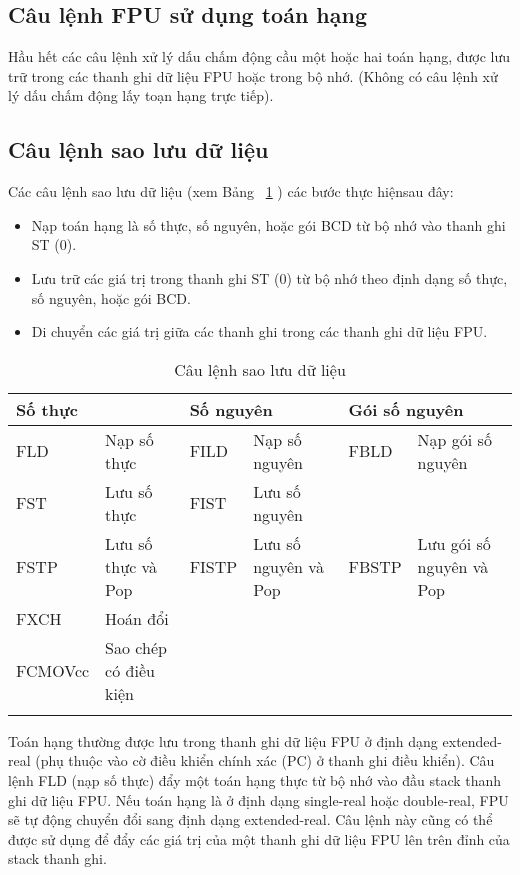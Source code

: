 		\subsection*{Câu lệnh FPU sử dụng toán hạng}
		Hầu hết các câu lệnh xử lý dấu chấm động cầu một hoặc hai toán hạng, được lưu trữ trong các thanh ghi dữ liệu FPU hoặc trong bộ nhớ. (Không có câu lệnh xử lý dấu chấm động lấy toạn hạng trực tiếp).
		
		\subsection*{ Câu lệnh sao lưu dữ liệu}
		Các câu lệnh sao lưu dữ liệu (xem Bảng ~\ref{tb:CauLenhSaoLuu} ) các bước thực hiệnsau đây:
		\begin{itemize}
			\renewcommand{\labelitemi}{\textbullet}
			\item Nạp toán hạng là số thực, số nguyên, hoặc gói BCD từ bộ nhớ vào thanh ghi ST (0).
			\item Lưu trữ các giá trị trong thanh ghi ST (0)  từ bộ nhớ theo định dạng số thực, số nguyên, hoặc gói BCD.
			\item  Di chuyển các giá trị giữa các thanh ghi trong các thanh ghi dữ liệu FPU.
		\end{itemize}		
		\begin{longtable}{|l|m{4cm}|l|m{3cm}|l|m{2.5cm}|}
			\hline
				\multicolumn{2}{|l|}{Số thực} & \multicolumn{2}{l|}{Số nguyên} & \multicolumn{2}{l|}{Gói số nguyên}\\
			\hline
			\hline
				FLD & Nạp số thực &  FILD & Nạp số nguyên &  FBLD & Nạp gói số nguyên  \\
				FST & Lưu số thực & FIST & Lưu số nguyên & & \\ 
				FSTP & Lưu số thực và Pop & FISTP & Lưu số nguyên và Pop & FBSTP  & Lưu gói số nguyên và Pop\\		    
				FXCH & Hoán đổi & & & & \\
				FCMOVcc & Sao chép có điều kiện  & & & &\\
			\hline
				\caption{Câu lệnh sao lưu dữ liệu}
				\label{tb:CauLenhSaoLuu}
		\end{longtable}

		Toán hạng thường được lưu trong thanh ghi dữ liệu FPU ở định dạng extended-real (phụ thuộc vào cờ điều khiển chính xác (PC) ở thanh ghi điều khiển). Câu lệnh FLD (nạp số thực) đẩy một toán hạng thực từ bộ nhớ vào đầu stack thanh ghi dữ liệu FPU. Nếu toán hạng là ở định dạng single-real hoặc double-real, FPU sẽ tự động chuyển đổi sang định dạng extended-real. Câu lệnh này cũng có thể được sử dụng để đẩy các giá trị của một thanh ghi dữ liệu FPU lên trên đỉnh của stack thanh ghi.\\
		
